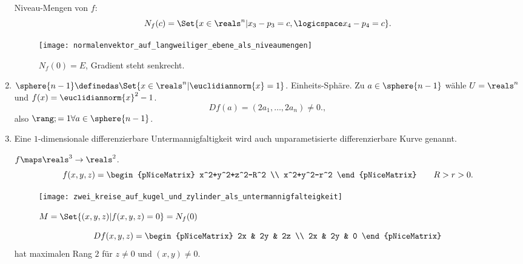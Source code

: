 \begin{beispiele*}
\begin{enumerate}
\begin{figure}[H]
\begin{equation*}
      \end{equation*}
    \end{figure}
    Niveau-Mengen von \( f \):
    \begin{equation*}
      N_f(c)=\Set{x\in \reals^n|x_3-p_3=c,\logicspace x_4-p_4=c}.
    \end{equation*}
    \begin{figure}[H]
      \centering
      \texttt{[image: normalenvektor\_auf\_langweiliger\_ebene\_als\_niveaumengen]}
      \caption*{\( N_f(0)=E \), Gradient steht senkrecht.}
      \label{fig:normalenvektor_auf_langweiliger_ebene_als_niveaumengen}
    \end{figure}
    \item \label{untermannigfaltigkeit:beispiele:sphaere}\( \sphere{n-1}\definedas \Set{x\in \reals^n|\euclidiannorm{x}=1} \). Einheits-Sphäre. Zu \( a\in \sphere{n-1} \) wähle \( U=\reals^n \) und \( f(x)=\euclidiannorm{x}^2-1 \). 
    \begin{equation*}
      Df(a)=(2a_1,\dotsc,2a_n)\neq 0.,
    \end{equation*}
    also \( \rang;=1 \forall a\in \sphere{n-1}\).
    \item Eine \( 1 \)-dimensionale differenzierbare Untermannigfaltigkeit wird auch unparametisierte differenzierbare Kurve genannt. 
    \begin{beispiel*}
      \( f\maps \reals^3\to \reals^2 \).
      \begin{equation*}
        f(x,y,z)=\begin{pNiceMatrix} x^2+y^2+z^2-R^2 \\ x^2+y^2-r^2 \end{pNiceMatrix}\qquad R>r>0.
      \end{equation*}
      \begin{figure}[H]
        \centering
        \texttt{[image: zwei\_kreise\_auf\_kugel\_und\_zylinder\_als\_untermannigfalteigkeit]}
        \caption*{\textcolor{red}{\( M=\Set{(x,y,z)|f(x,y,z)=0}=N_f(0) \)}}
        \label{fig:zwei_kreise_auf_kugel_und_zylinder_als_untermannigfalteigkeit}
      \end{figure}
      \begin{equation*}
        Df(x,y,z)=\begin{pNiceMatrix} 2x & 2y & 2z \\ 2x & 2y & 0 \end{pNiceMatrix}
      \end{equation*}
      hat maximalen Rang \( 2 \) für \( z\neq 0 \) und \( (x,y)\neq 0 \).


\end{beispiel*}
\end{enumerate}
\end{beispiele*}
